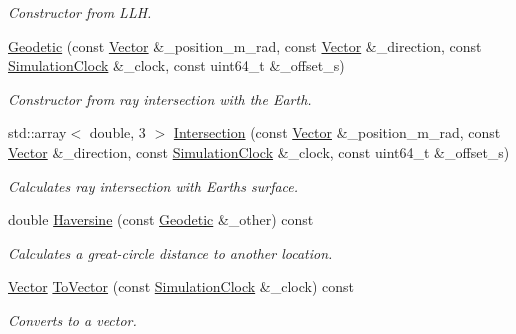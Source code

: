 \begin{DoxyCompactItemize}
\begin{DoxyCompactList}\small\item\em Constructor from L\+LH. \end{DoxyCompactList}\item 
\hyperlink{classosse_1_1collaborate_1_1_geodetic_afcdcf0c690a911d8bb93b2c822988ccf}{Geodetic} (const \hyperlink{classosse_1_1collaborate_1_1_vector}{Vector} \&\+\_\+position\+\_\+m\+\_\+rad, const \hyperlink{classosse_1_1collaborate_1_1_vector}{Vector} \&\+\_\+direction, const \hyperlink{classosse_1_1collaborate_1_1_simulation_clock}{Simulation\+Clock} \&\+\_\+clock, const uint64\+\_\+t \&\+\_\+offset\+\_\+s)
\begin{DoxyCompactList}\small\item\em Constructor from ray intersection with the Earth. \end{DoxyCompactList}\item 
std\+::array$<$ double, 3 $>$ \hyperlink{classosse_1_1collaborate_1_1_geodetic_a6ef067b2b517a75ddb0c5fa76449d27b}{Intersection} (const \hyperlink{classosse_1_1collaborate_1_1_vector}{Vector} \&\+\_\+position\+\_\+m\+\_\+rad, const \hyperlink{classosse_1_1collaborate_1_1_vector}{Vector} \&\+\_\+direction, const \hyperlink{classosse_1_1collaborate_1_1_simulation_clock}{Simulation\+Clock} \&\+\_\+clock, const uint64\+\_\+t \&\+\_\+offset\+\_\+s)
\begin{DoxyCompactList}\small\item\em Calculates ray intersection with Earth\textquotesingle{}s surface. \end{DoxyCompactList}\item 
double \hyperlink{classosse_1_1collaborate_1_1_geodetic_a7f70ddcb884dbf99264e3e7e92ac7948}{Haversine} (const \hyperlink{classosse_1_1collaborate_1_1_geodetic}{Geodetic} \&\+\_\+other) const
\begin{DoxyCompactList}\small\item\em Calculates a great-\/circle distance to another location. \end{DoxyCompactList}\item 
\hyperlink{classosse_1_1collaborate_1_1_vector}{Vector} \hyperlink{classosse_1_1collaborate_1_1_geodetic_a4a46857018f20a00720e05fe705828ec}{To\+Vector} (const \hyperlink{classosse_1_1collaborate_1_1_simulation_clock}{Simulation\+Clock} \&\+\_\+clock) const
\begin{DoxyCompactList}\small\item\em Converts to a vector. \end{DoxyCompactList}\item 

\end{DoxyCompactItemize}
